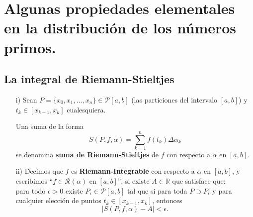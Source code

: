 \documentclass[12pt]{article}
\begin{document}
\begin{eg}
    \lipsum[1]
\end{eg}


\section{Algunas propiedades elementales en la distribución de los números primos.}

\subsection{La integral de Riemann-Stieltjes}

\lipsum[1] \cite{apostol1998introduction}

\begin{definition}
    \begin{itemize}\item[i)] Sean $P=\{x_0,x_1,...,x_n\}\in\mathcal{P}[a,b]$ (las particiones del intervalo $[a,b]$) y   $t_{k}\in [x_{k-1},x_k]$ cualesquiera. 
    
    Una suma de la forma $$S(P,f,\alpha)=\sum_{k=1}^{n}f(t_k)\Delta \alpha_k$$ se denomina \textbf{suma de Riemann-Stieltjes} de $f$ con respecto a $\alpha$ en $[a,b]$.
    
    \item[ii)] Decimos que $f$ es \textbf{Riemann-Integrable} con respecto a $\alpha$ en $[a,b]$, y escribimos ``$f\in \mathcal{R}(\alpha)$ en $[a,b]$'', si existe $A\in \mathbb R$ que satisface que:\\ 
    para todo $\epsilon>0$ existe $P_{\epsilon}\in \mathcal{P}[a,b]$ tal que si para toda $P\supset P_{\epsilon}$ y para cualquier elección de puntos $t_{k}\in [x_{k-1},x_k]$, entonces $$\mid S(P,f,\alpha) - A\mid <\epsilon.$$
    \end{itemize}
\end{definition}


\begin{prop}
    \lipsum[3]
\end{prop}


\begin{lemma}
    \lipsum[2]
\end{lemma}
\end{document}
